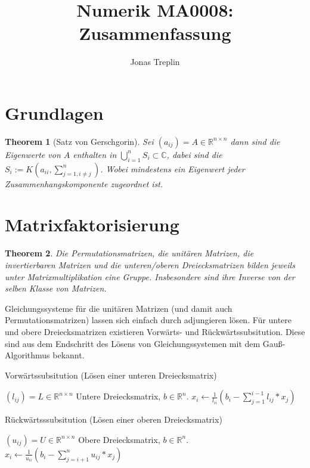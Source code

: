 \documentclass[10pt,a4paper]{article}
\title{Numerik MA0008: Zusammenfassung}
\author{Jonas Treplin}
\newtheorem{theorem}{Theorem}
\begin{document}
	\maketitle
	\section{Grundlagen}
	\begin{theorem}[Satz von Gerschgorin]
		Sei $(a_{ij})=A \in \mathbb{R}^{n\times n}$ dann sind die Eigenwerte von $A$ enthalten in $\bigcup_{i=1}^{n}S_i \subset \mathbb{C}$, dabei sind die $S_i := K(a_{ii}, \sum_{j=1, i\neq j}^{n})$. Wobei mindestens ein Eigenwert jeder Zusammenhangskomponente zugeordnet ist.
	\end{theorem}
	\section{Matrixfaktorisierung}
	\begin{theorem}
		Die Permutationsmatrizen, die unitären Matrizen, die invertierbaren Matrizen und die unteren/oberen Dreiecksmatrizen bilden jeweils unter Matrixmultiplikation eine Gruppe. Insbesondere sind ihre Inverse von der selben Klasse von Matrizen. 
	\end{theorem}
	Gleichungssysteme für die unitären Matrizen (und damit auch Permutationsmatrizen) lassen sich einfach durch adjungieren lösen. Für untere und obere Dreiecksmatrizen existieren Vorwärts- und Rückwärtssubsitution.  Diese sind aus dem Endschritt des Lösens von Gleichungssystemen mit dem Gauß-Algorithmus bekannt.
	\begin{algorithm}
		\caption{Vorwärtssubsitution (Lösen einer unteren Dreiecksmatrix)}
		\begin{algorithmic}
			\Require $(l_{ij}) = L \in \mathbb{R}^{n\times n}$ Untere Dreiecksmatrix, $b \in \mathbb{R}^n$.
				\State $x_i \leftarrow \frac{1}{l_{ii}}(b_i - \sum_{j=1}^{i-1}l_{ij}*x_j)$
			\EndFor
		\end{algorithmic}
	\end{algorithm}
	\begin{algorithm}
		\caption{Rückwärtsssubsitution (Lösen einer oberen Dreiecksmatrix)}
		\begin{algorithmic}
			\Require $(u_{ij}) = U \in \mathbb{R}^{n\times n}$ Obere Dreiecksmatrix, $b \in \mathbb{R}^n$.
			\For{$i\in n:1$}
			\State $x_i \leftarrow \frac{1}{u_{ii}}(b_i - \sum_{j=i+1}^{n}u_{ij}*x_j)$
			\EndFor
		\end{algorithmic}
	\end{algorithm}
\end{document}
